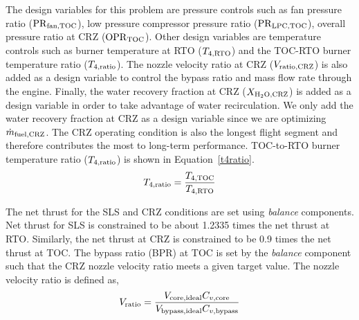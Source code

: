 \documentclass[conf]{new-aiaa}
\begin{document}
The design variables for this problem are pressure controls such as fan pressure ratio ($\rm{PR}_{\rm{fan,TOC}}$), low pressure compressor pressure ratio ($\rm{PR}_{\rm{LPC,TOC}}$), overall pressure ratio at CRZ ($\rm{OPR}_{\rm{TOC}}$).
Other design variables are temperature controls such as burner temperature at RTO ($T_{4,\rm{RTO}}$) and the TOC-RTO burner temperature ratio ($T_{4,\rm{ratio}}$).
The nozzle velocity ratio at CRZ ($V_{\rm{ratio,CRZ}}$) is also added as a design variable to control the bypass ratio and mass flow rate through the engine.
Finally, the water recovery fraction at CRZ ($X_{\rm{H_2O,CRZ}}$) is added as a design variable in order to take advantage of water recirculation.
We only add the water recovery fraction at CRZ as a design variable since we are optimizing $\dot{m}_{\rm{fuel,CRZ}}$.
The CRZ operating condition is also the longest flight segment and therefore contributes the most to long-term performance.
TOC-to-RTO burner temperature ratio ($T_{4,\rm{ratio}}$) is shown in Equation~\eqref{t4ratio}.
\begin{equation}
    T_{4,\rm{ratio}} = \frac{T_{4,\rm{TOC}}}{T_{4,\rm{RTO}}}
    \label{t4ratio}
\end{equation}


The net thrust for the SLS and CRZ conditions are set using \emph{balance} components.
Net thrust for SLS is constrained to be about 1.2335 times the net thrust at RTO.
Similarly, the net thrust at CRZ is constrained to be 0.9 times the net thrust at TOC.
The bypass ratio (BPR) at TOC is set by the \emph{balance} component such that the CRZ nozzle velocity ratio meets a given target value.
The nozzle velocity ratio is defined as,
\begin{equation}
    V_{\rm{ratio}} = \frac{V_{\rm{core,ideal}}C_{v,\rm{core}}}{V_{\rm{bypass,ideal}}C_{v,\rm{bypass}}}
    \label{eq:vratio}
\end{equation}
\end{document}
